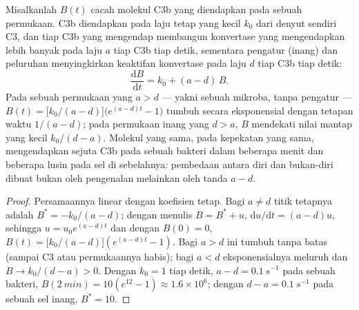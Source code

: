 \begin{theorem}\label{thm:b3:innate-immunity:complement}
Misalkanlah $B(t)$ cacah molekul C3b yang diendapkan pada sebuah permukaan. C3b
diendapkan pada laju tetap yang kecil $k_{0}$ dari denyut sendiri
C3, dan tiap C3b yang mengendap membangun konvertase yang mengendapkan lebih
banyak pada laju $a$ tiap C3b tiap detik, sementara pengatur (inang) dan
peluruhan menyingkirkan keaktifan konvertase pada laju $d$ tiap C3b tiap detik:
\[
\frac{\mathrm{d}B}{\mathrm{d}t} = k_{0} + (a - d)\,B .
\]
Pada sebuah permukaan yang $a > d$ --- yakni sebuah mikroba, tanpa pengatur ---
$B(t) = \bigl[k_{0}/(a-d)\bigr]\bigl(e^{(a-d)t} - 1\bigr)$ tumbuh
secara eksponensial dengan tetapan waktu $1/(a - d)$; pada permukaan inang yang
$d > a$, $B$ mendekati nilai mantap yang kecil $k_{0}/(d - a)$. Molekul
yang sama, pada kepekatan yang sama, mengendapkan sejuta C3b pada sebuah
bakteri dalam beberapa menit dan beberapa lusin pada sel di sebelahnya:
pembedaan antara diri dan bukan-diri dibuat bukan oleh pengenalan melainkan oleh
tanda $a - d$.
\end{theorem}
\begin{proof}
Persamaannya linear dengan koefisien tetap. Bagi $a \ne d$ titik
tetapnya adalah $B^{*} = -k_{0}/(a-d)$; dengan menulis $B = B^{*} + u$,
$\mathrm{d}u/\mathrm{d}t = (a-d)u$, sehingga $u = u_{0}e^{(a-d)t}$ dan dengan
$B(0) = 0$, $B(t) = \bigl[k_{0}/(a-d)\bigr](e^{(a-d)t} - 1)$. Bagi $a > d$
ini tumbuh tanpa batas (sampai C3 atau permukaannya habis); bagi $a < d$
eksponensialnya meluruh dan $B \to k_{0}/(d-a) > 0$. Dengan $k_{0} = 1$
tiap detik, $a - d = \qty{0.1}{s^{-1}}$ pada sebuah bakteri, $B(\qty{2}{min})
= 10(e^{12} - 1) \approx 1.6\times 10^{6}$; dengan $d - a =
\qty{0.1}{s^{-1}}$ pada sebuah sel inang, $B^{*} = 10$.
\end{proof}


